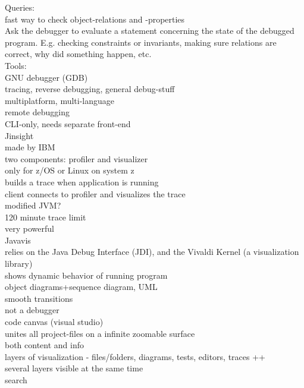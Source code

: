 Queries:\\
	fast way to check object-relations and -properties\\
	Ask the debugger to evaluate a statement concerning the state of the debugged program. E.g. checking constraints or invariants, making sure relations are correct, why did something happen, etc.\\

Tools:\\

GNU debugger (GDB)\\
	tracing, reverse debugging, general debug-stuff\\
	multiplatform, multi-language\\
	remote debugging\\
	CLI-only, needs separate front-end\\

Jinsight\\
	made by IBM\\
	two components: profiler and visualizer\\
	only for z/OS or Linux on system z\\
	builds a trace when application is running\\
	client connects to profiler and visualizes the trace\\
	modified JVM?\\
	120 minute trace limit\\
	very powerful\\

Javavis\\
	relies on the Java Debug Interface (JDI), and the Vivaldi Kernel (a visualization library)\\
	shows dynamic behavior of running program\\
	object diagrams+sequence diagram, UML\\
	smooth transitions\\
	not a debugger\\
	
code canvas (visual studio)\\
	unites all project-files on a infinite zoomable surface\\
	both content and info\\
	layers of visualization - files/folders, diagrams, tests, editors, traces ++\\
	several layers visible at the same time\\
	search\\

